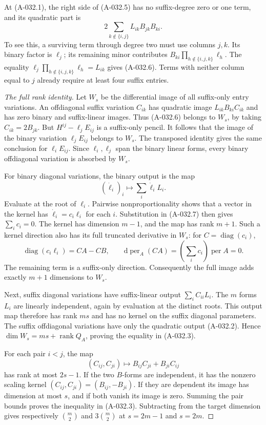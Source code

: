 At (A-032.1), the right side of (A-032.5) has no suffix-degree
zero or one term, and its quadratic part is
\[
                         2\sum_{k\notin\{i,j\}}
                                  L_{ik} B_{jk}B_{ki}.          \tag{A-032.6}
\]
To see this, a surviving term through degree two must use
columns \(j,k\). Its binary factor is \(\ell_j\); its remaining
minor contributes \(B_{ki}\prod_{h\notin\{i,j,k\}}\ell_h\).
The equality
\(\ell_j\prod_{h\notin\{i,j,k\}}\ell_h=L_{ik}\)
gives (A-032.6). Terms with neither column equal to \(j\)
already require at least four suffix entries.

\begin{proof}[The full rank identity]
Let \(W_s\) be the differential image of all suffix-only
entry variations. An offdiagonal suffix variation \(C_{ik}\)
has quadratic image \(L_{ik}B_{ki}C_{ik}\) and has zero
binary and suffix-linear images. Thus (A-032.6) belongs to
\(W_s\), by taking \(C_{ik}=2B_{jk}\).
But \(H^{ij}-\ell_jE_{ij}\) is a suffix-only pencil.
It follows that the image of the binary variation
\(\ell_jE_{ij}\) belongs to \(W_s\).
The transposed identity gives the same conclusion for
\(\ell_iE_{ij}\). Since \(\ell_i,\ell_j\) span the binary
linear forms, every binary offdiagonal variation is absorbed
by \(W_s\).

For binary diagonal variations, the binary output is the map
\[
          (\dot\ell_i)_i\longmapsto\sum_i\dot\ell_i L_i.
                                                               \tag{A-032.7}
\]
Evaluate at the root of \(\ell_i\). Pairwise nonproportionality
shows that a vector in the kernel has
\(\dot\ell_i=c_i\ell_i\) for each \(i\). Substitution in
(A-032.7) then gives \(\sum_i c_i=0\).
The kernel has dimension \(m-1\), and the map has rank \(m+1\).
Such a kernel direction also has its full truncated derivative
in \(W_s\): for \(C=\operatorname{diag}(c_i)\),
\[
 \operatorname{diag}(c_i\ell_i)=CA-CB,\qquad
        \mathrm d\operatorname{per}_A(CA)
                          =(\sum_i c_i)\operatorname{per}A=0.
 \]
The remaining term is a suffix-only direction.
Consequently the full image adds exactly \(m+1\) dimensions
to \(W_s\).

Next, suffix diagonal variations have suffix-linear output
\(\sum_i C_{ii}L_i\). The \(m\) forms \(L_i\) are linearly
independent, again by evaluation at the distinct roots.
This output map therefore has rank \(ms\) and has no kernel
on the suffix diagonal parameters. The suffix offdiagonal
variations have only the quadratic output (A-032.2).
Hence \(\dim W_s=ms+\operatorname{rank}Q_A\), proving the
equality in (A-032.3).

For each pair \(i<j\), the map
\[
             (C_{ij},C_{ji})\longmapsto
                         B_{ij}C_{ji}+B_{ji}C_{ij}
\]
has rank at most \(2s-1\). If the two \(B\)-forms are
independent, it has the nonzero scaling kernel
\((C_{ij},C_{ji})=(B_{ij},-B_{ji})\).
If they are dependent its image has dimension at most \(s\),
and if both vanish its image is zero.
Summing the pair bounds proves the inequality in (A-032.3).
Subtracting from the target dimension gives respectively
\(\binom m2\) and \(3\binom m2\) at \(s=2m-1\) and \(s=2m\).
\end{proof}

